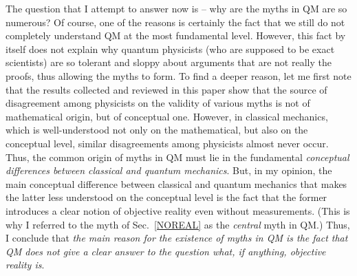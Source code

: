 \documentclass[12pt]{article}
\begin{document}
The question that I attempt to answer now is -- why are the myths in QM
are so numerous? Of course, one of the reasons is certainly the fact 
that we still do not completely understand QM at the most fundamental level.
However, this fact by itself does not explain why 
quantum physicists (who are supposed
to be exact scientists) are so tolerant and sloppy about arguments 
that are not really the proofs, thus allowing the myths to form. 
To find a deeper reason, let me first note that
the results collected and reviewed in this paper 
show that the source of disagreement among physicists on the validity 
of various myths is not of mathematical origin, but of 
conceptual one. However, in 
classical mechanics, which is well-understood
not only on the mathematical, but also on the conceptual level,
similar disagreements among physicists almost never occur.
Thus, the common origin of myths in QM must lie in the 
fundamental {\em conceptual differences between classical 
and quantum mechanics}. But, in my opinion,
the main conceptual difference between classical and quantum mechanics
that makes the latter less understood on the conceptual level 
is the fact that the former introduces a clear notion of objective reality 
even without measurements. (This is why I referred 
to the myth of Sec.~\ref{NOREAL} as the {\em central} myth in QM.) 
Thus, I conclude that {\em the main reason for the existence of myths in QM
is the fact that QM does not give a clear answer to the question 
what, if anything, objective reality is}.  
\end{document}
